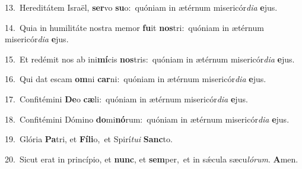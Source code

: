 {\numbfont\textcolor{\numbcolor}{13.}}~Hereditátem Israël, \textbf{ser}\-vo \textbf{su}\-o:~\star quóniam in ætérnum misericór\-\textit{di}\-\textit{a} \textbf{e}\-jus.\par
{\numbfont\textcolor{\numbcolor}{14.}}~Quia in humilitáte nostra memor \textbf{fu}\-it \textbf{nos}\-tri:~\star quóniam in ætérnum misericór\-\textit{di}\-\textit{a} \textbf{e}\-jus.\par
{\numbfont\textcolor{\numbcolor}{15.}}~Et redémit nos ab ini\-\textbf{mí}\-cis \textbf{nos}\-tris:~\star quóniam in ætérnum misericór\-\textit{di}\-\textit{a} \textbf{e}\-jus.\par
{\numbfont\textcolor{\numbcolor}{16.}}~Qui dat escam \textbf{om}\-ni \textbf{car}\-ni:~\star quóniam in ætérnum misericór\-\textit{di}\-\textit{a} \textbf{e}\-jus.\par
{\numbfont\textcolor{\numbcolor}{17.}}~Confitémini \textbf{De}\-o \textbf{cæ}\-li:~\star quóniam in ætérnum misericór\-\textit{di}\-\textit{a} \textbf{e}\-jus.\par
{\numbfont\textcolor{\numbcolor}{18.}}~Confitémini Dómino \textbf{do}\-mi\-\textbf{nó}\-rum:~\star quóniam in ætérnum misericór\-\textit{di}\-\textit{a} \textbf{e}\-jus.\par
{\numbfont\textcolor{\numbcolor}{19.}}~Glória \textbf{Pa}\-tri, et \textbf{Fí}\-\textbf{li}o,~\star et Spirí\-\textit{tu}\-\textit{i} \textbf{Sanc}\-to.\par
{\numbfont\textcolor{\numbcolor}{20.}}~Sicut erat in princípio, et \textbf{nunc}\-, et \textbf{sem}\-per,~\star et in sǽcula sæcu\-\textit{ló}\-\textit{rum}. \textbf{A}\-men.\par

